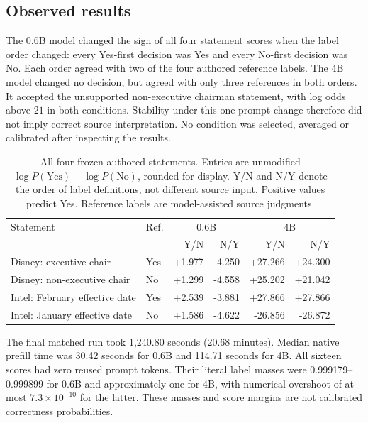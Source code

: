 \subsection{Observed results}
\label{sec:results}
The 0.6B model changed the sign of all four statement scores when the label
order changed: every Yes-first decision was Yes and every No-first decision
was No. Each order agreed with two of the four authored reference labels.
The 4B model changed no decision, but agreed with only three references in
both orders. It accepted the unsupported non-executive chairman statement,
with log odds above $21$ in both conditions. Stability under this one prompt
change therefore did not imply correct source interpretation. No condition
was selected, averaged or calibrated after inspecting the results.

\begin{table}[h]
\centering\small
\begin{tabular}{llrrrr}
\toprule
Statement & Ref. & \multicolumn{2}{c}{0.6B} & \multicolumn{2}{c}{4B} \\
 & & Y/N & N/Y & Y/N & N/Y \\
\midrule
Disney: executive chair & Yes & +1.977 & -4.250 & +27.266 & +24.300 \\
Disney: non-executive chair & No & +1.299 & -4.558 & +25.202 & +21.042 \\
Intel: February effective date & Yes & +2.539 & -3.881 & +27.866 & +27.866 \\
Intel: January effective date & No & +1.586 & -4.622 & -26.856 & -26.872 \\
\bottomrule
\end{tabular}
\caption{All four frozen authored statements. Entries are unmodified
$\log P(\mathrm{Yes})-\log P(\mathrm{No})$, rounded for display.
Y/N and N/Y denote the order of label definitions, not different source input.
Positive values predict Yes. Reference labels are model-assisted source judgments.}
\end{table}

The final matched run took 1,240.80 seconds (20.68 minutes). Median native
prefill time was 30.42 seconds for 0.6B and 114.71 seconds for 4B. All sixteen
scores had zero reused prompt tokens. Their literal label masses were
0.999179--0.999899 for 0.6B and approximately one for 4B, with numerical
overshoot of at most $7.3\times10^{-10}$ for the latter. These masses and score
margins are not calibrated correctness probabilities.

